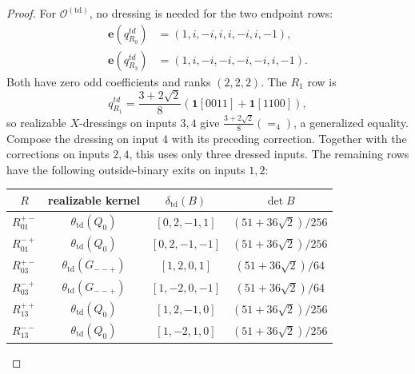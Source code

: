 \documentclass[11pt,letterpaper,onecolumn]{article}
\theoremstyle{plain}
\theoremstyle{definition}
\theoremstyle{remark}
\newcommand{\OctTD}{{\mathcal O^{(\mathrm{td})}}}
\newcommand{\Eq}{=}
\newcommand{\one}{\mathbf 1}
\begin{document}
\begin{proof}
For \(\OctTD\), no dressing is needed for the two endpoint rows:
\begin{equation*}
\begin{aligned}
 \mathbf e(q_{R_0}^{td})&=(1,i,-i,i,i,-i,i,-1),\\
 \mathbf e(q_{R_3}^{td})&=(1,i,-i,-i,-i,-i,i,-1).
\end{aligned}
\end{equation*}
Both have zero odd coefficients and ranks \((2,2,2)\).  The \(R_1\) row is
\[
 q_{R_1}^{td}=\frac{3+2\sqrt2}{8}
  (\one[0011]+\one[1100]),
\]
so realizable \(X\)-dressings on inputs \(3,4\) give
\(\frac{3+2\sqrt2}{8}(\Eq_4)\), a generalized equality.
Compose the dressing on input \(4\) with its preceding correction. Together
with the corrections on inputs \(2,4\), this uses only three dressed inputs.
The remaining rows have the following outside-binary exits on inputs
\(1,2\):
\begin{center}
\normalsize
\setlength{\tabcolsep}{4pt}
\begin{tabular}{cccc}
\toprule
\(R\)&realizable kernel&\(\delta_{\mathrm{td}}(B)\)&\(\det B\)\\
\midrule
\(R_{01}^{+-}\)&\(\theta_{\mathrm{td}}(Q_0)\)&\([0,2,-1,1]\)&
 \((51+36\sqrt2)/256\)\\
\(R_{01}^{-+}\)&\(\theta_{\mathrm{td}}(Q_0)\)&\([0,2,-1,-1]\)&
 \((51+36\sqrt2)/256\)\\
\(R_{03}^{+-}\)&\(\theta_{\mathrm{td}}(G_{--+})\)&\([1,2,0,1]\)&
 \((51+36\sqrt2)/64\)\\
\(R_{03}^{-+}\)&\(\theta_{\mathrm{td}}(G_{--+})\)&\([1,-2,0,-1]\)&
 \((51+36\sqrt2)/64\)\\
\(R_{13}^{++}\)&\(\theta_{\mathrm{td}}(Q_0)\)&\([1,2,-1,0]\)&
 \((51+36\sqrt2)/256\)\\
\(R_{13}^{--}\)&\(\theta_{\mathrm{td}}(Q_0)\)&\([1,-2,1,0]\)&
 \((51+36\sqrt2)/256\)\\
\bottomrule
\end{tabular}
\end{center}


\end{proof}
\end{document}
